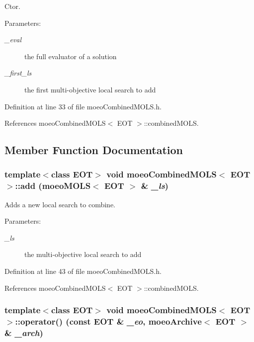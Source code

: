 Ctor. 

\begin{Desc}
\item[Parameters:]
\begin{description}
\item[{\em \_\-eval}]the full evaluator of a solution \item[{\em \_\-first\_\-ls}]the first multi-objective local search to add \end{description}
\end{Desc}


Definition at line 33 of file moeo\-Combined\-MOLS.h.

References moeo\-Combined\-MOLS$<$ EOT $>$::combined\-MOLS.

\subsection{Member Function Documentation}
\subsubsection{\setlength{\rightskip}{0pt plus 5cm}template$<$class EOT$>$ void {\bf moeo\-Combined\-MOLS}$<$ EOT $>$::add ({\bf moeo\-MOLS}$<$ EOT $>$ \& {\em \_\-ls})\hspace{0.3cm}{\tt  [inline]}}\label{classmoeoCombinedMOLS_bd6b8f46211d5d531753c69fcd76cba4}


Adds a new local search to combine. 

\begin{Desc}
\item[Parameters:]
\begin{description}
\item[{\em \_\-ls}]the multi-objective local search to add \end{description}
\end{Desc}


Definition at line 43 of file moeo\-Combined\-MOLS.h.

References moeo\-Combined\-MOLS$<$ EOT $>$::combined\-MOLS.
\subsubsection{\setlength{\rightskip}{0pt plus 5cm}template$<$class EOT$>$ void {\bf moeo\-Combined\-MOLS}$<$ EOT $>$::operator() (const EOT \& {\em \_\-eo}, {\bf moeo\-Archive}$<$ EOT $>$ \& {\em \_\-arch})\hspace{0.3cm}{\tt  [inline]}}\label{classmoeoCombinedMOLS_fa7de12db00b89feb139372603bba4aa}


